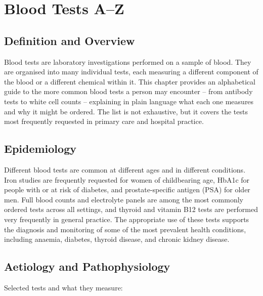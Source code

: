 \chapter{Blood Tests A--Z}

\section*{Definition and Overview}
Blood tests are laboratory investigations performed on a sample of blood. They are organised into many individual tests, each measuring a different component of the blood or a different chemical within it. This chapter provides an alphabetical guide to the more common blood tests a person may encounter -- from antibody tests to white cell counts -- explaining in plain language what each one measures and why it might be ordered. The list is not exhaustive, but it covers the tests most frequently requested in primary care and hospital practice.

\section*{Epidemiology}
Different blood tests are common at different ages and in different conditions. Iron studies are frequently requested for women of childbearing age, HbA1c for people with or at risk of diabetes, and prostate-specific antigen (PSA) for older men. Full blood counts and electrolyte panels are among the most commonly ordered tests across all settings, and thyroid and vitamin B12 tests are performed very frequently in general practice. The appropriate use of these tests supports the diagnosis and monitoring of some of the most prevalent health conditions, including anaemia, diabetes, thyroid disease, and chronic kidney disease.

\section*{Aetiology and Pathophysiology}
Selected tests and what they measure:

